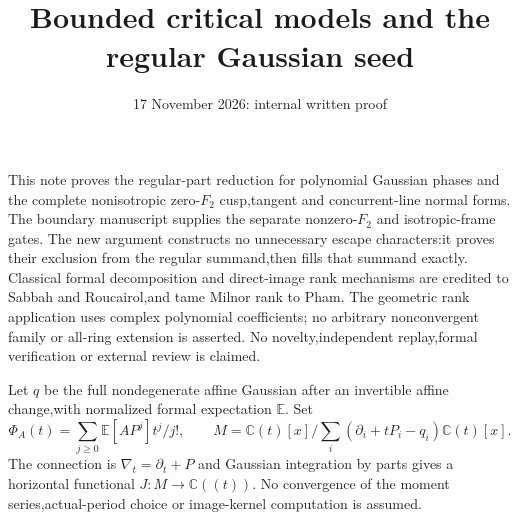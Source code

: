 \documentclass[11pt]{article}
\title{Bounded critical models and the regular Gaussian seed}
\author{}\date{17 November 2026: internal written proof}
\theoremstyle{definition}\newtheorem{definition}[theorem]{Definition}
\theoremstyle{remark}\newtheorem{remark}[theorem]{Remark}
\begin{document}
\maketitle
This note proves the regular-part reduction for polynomial Gaussian
phases and the complete nonisotropic zero-$F_2$ cusp,tangent and
concurrent-line normal forms. The boundary manuscript supplies the
separate nonzero-$F_2$ and isotropic-frame gates. The new argument
constructs no unnecessary escape characters:it proves their exclusion
from the regular summand,then fills that summand exactly.
Classical formal decomposition and direct-image rank mechanisms are
credited to Sabbah and Roucairol,and tame Milnor rank to Pham.
The geometric rank application uses complex polynomial coefficients;
no arbitrary nonconvergent family or all-ring extension is asserted.
No novelty,independent replay,formal verification or external review
is claimed.

Let $q$ be the full nondegenerate affine Gaussian after an invertible
affine change,with normalized formal expectation $\mathbb E$. Set
\[
 \Phi_A(t)=\sum_{j\ge0}\mathbb E[AP^j]t^j/j!,\qquad
 M=\mathbb C(t)[x]/\sum_i(\partial_i+tP_i-q_i)\mathbb C(t)[x].
\]
The connection is $\nabla_t=\partial_t+P$ and Gaussian integration by
parts gives a horizontal functional $J:M\to\mathbb C((t))$.
No convergence of the moment series,actual-period choice or image-kernel
computation is assumed.
\end{document}
